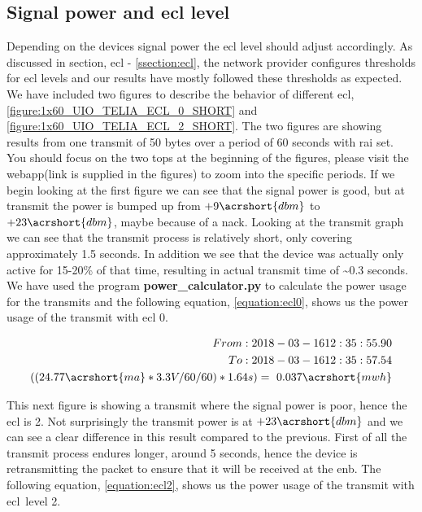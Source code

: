 \documentclass[USenglish]{ifimaster}  %
\begin{document}
\subsection{Signal power and \acrshort{ecl} level} \label{ssection:ecltest}
Depending on the devices signal power the \acrshort{ecl} level should adjust accordingly. As discussed in section, \acrshort{ecl} - \vref{ssection:ecl}, the network provider configures thresholds for \acrshort{ecl} levels and our results have mostly followed these thresholds as expected. We have included two figures to describe the behavior of different \acrshort{ecl}, \vref{figure:1x60_UIO_TELIA_ECL_0_SHORT} and \vref{figure:1x60_UIO_TELIA_ECL_2_SHORT}.
The two figures are showing results from one transmit of 50 bytes over a period of 60 seconds with \acrshort{rai} set. You should focus on the two tops at the beginning of the figures, please visit the webapp(link is supplied in the figures) to zoom into the specific periods. If we begin looking at the first figure we can see that the signal power is good, but at transmit the power is bumped up from ${+9 \acrshort{dbm}}$ to ${+23 \acrshort{dbm}}$, maybe because of a \acrshort{nack}. Looking at the transmit graph we can see that the transmit process is relatively short, only covering approximately 1.5 seconds.
In addition we see that the device was actually only active for 15-20\% of that time, resulting in actual transmit time of \textasciitilde0.3 seconds. We have used the program \textbf{power\_calculator.py} to calculate the power usage for the transmits and the following equation, \vref{equation:ecl0}, shows us the power usage of the transmit with \acrshort{ecl} 0.

\begin{equation} \label{equation:ecl0}
\begin{aligned}
From: 2018-03-16 12:35:55.90 \\
To: 2018-03-16 12:35:57.54 \\
((24.77\acrshort{ma} * 3.3V / 60 / 60 ) * 1.64s) = ~0.037\acrshort{mwh} \\
\end{aligned}
\end{equation}

This next figure is showing a transmit where the signal power is poor, hence the \acrshort{ecl} is 2. Not surprisingly the transmit power is at ${+23 \acrshort{dbm}}$ and we can see a clear difference in this result compared to the previous. First of all the transmit process endures longer, around 5 seconds, hence the device is retransmitting the packet to ensure that it will be received at the \acrshort{enb}. The following equation, \vref{equation:ecl2}, shows us the power usage of the transmit with \acrshort{ecl} level 2.
\end{document}
